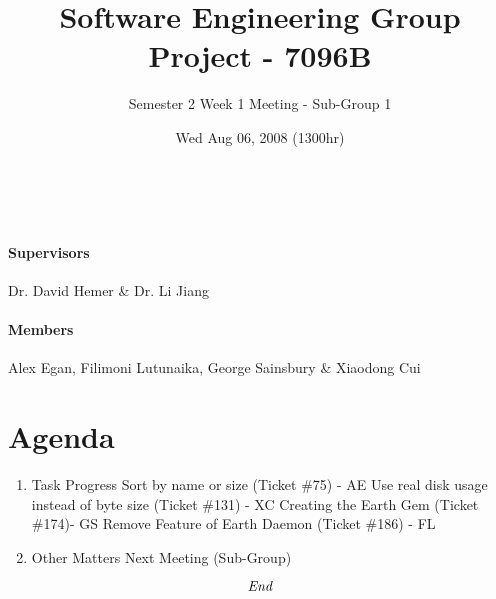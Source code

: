 \documentclass[10pt, a4]{article}
\begin{document}
\title{Software Engineering Group Project - 7096B}
\author{Semester 2 Week 1 Meeting - Sub-Group 1}
\date{Wed Aug 06, 2008 (1300hr)}

\maketitle
 
\\ 

\paragraph{Supervisors} Dr. David Hemer \& Dr. Li Jiang

\paragraph{Members} Alex Egan, Filimoni Lutunaika, George Sainsbury \& Xiaodong Cui

\section*{Agenda}

\begin{enumerate}
\item Task Progress
\subitem Sort by name or size (Ticket \#75) - AE
\subitem Use real disk usage instead of byte size (Ticket \#131) - XC
\subitem Creating the Earth Gem  (Ticket \#174)- GS
\subitem Remove Feature of Earth Daemon (Ticket \#186) - FL

\item Other Matters
\subitem Next Meeting (Sub-Group)

\end{enumerate}

\[\emph{End}\]
\end{document}
